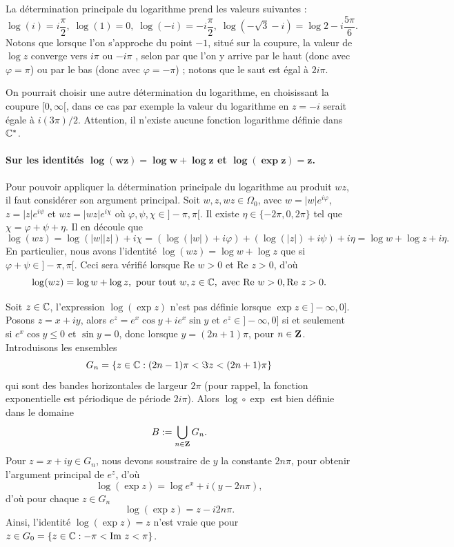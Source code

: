 La détermination principale du logarithme prend les valeurs suivantes :
\[\log (i)=i \frac{\pi}{2}, \; \log (1)=0,\; \log(-i)=-i \frac{\pi}{2},\; \log(-\sqrt{3} -i)=\log 2 -i\frac{5 \pi}{6}.\]
Notons que lorsque l'on s'approche du point $-1$, situé sur la coupure, la valeur de $\log z$ converge vers $i \pi$ ou $-i \pi$ , selon par que l'on y arrive par le \og haut \fg{} (donc avec $\varphi=\pi$) ou par le \og bas \fg{} (donc avec $\varphi=-\pi$) ; notons que le saut est égal à $2 i \pi$.

On pourrait choisir une autre détermination du logarithme, en choisissant la coupure $[0,\infty[$, dans ce cas par exemple la valeur du logarithme en $z=-i$ serait égale à $i (3 \pi)/2$. Attention, il n'existe aucune fonction logarithme définie dans $\mathbb{C}^\ast$. 


\paragraph{Sur les identités $\boldsymbol{\log(w z)=\log w + \log z}$ et $\boldsymbol{\log(\exp z)=z}$.} Pour pouvoir appliquer la détermination principale du logarithme au produit $w z$, il faut considérer son argument principal. Soit $w, z, w z \in \Omega_0$, avec $w=\lvert w \rvert e^{i \varphi}$, $z = \lvert z \rvert e^{i \psi}$ et $w z =\lvert w z \rvert e^{i \chi}$ où $\varphi, \psi, \chi \in ]-\pi, \pi[$. Il existe $\eta \in \{-2 \pi, 0, 2\pi \}$ tel que $\chi=\varphi + \psi + \eta$. Il en découle que
\[\log(w z) = \log (\lvert w \rvert\lvert z \rvert) + i \chi =  (\log (\lvert w \rvert) + i \varphi) + (\log (\lvert z \rvert) + i \psi) + i\eta = \log w + \log z + i\eta.\]
En particulier, nous avons l'identité $\log(w z)=\log w + \log z$ que si $\varphi + \psi \in ]-\pi, \pi[.$ Ceci sera vérifié lorsque $\text{Re } w>0$ et $\text{Re } z>0$, d'où
\[\log(w z)=\log w + \log z, \text{ pour tout } w, z \in \mathbb{C}, \text{ avec } \text{Re } w>0, \text{Re } z>0.\]

Soit $z \in \mathbb{C}$, l'expression $\log(\exp z)$ n'est pas définie lorsque $\exp z \in ]-\infty, 0]$. Posons $z=x + iy$, alors $e^z=e^x \cos y + i e^x \sin y$ et $e^z \in ]-\infty, 0]$ si et seulement si $e^x \cos y \leq  0$ et $\sin y=0$, donc lorsque $y=(2n+1)\pi$, pour $n \in {\mathbf Z}$. Introduisons les ensembles
\[G_n = \{z \in \mathbb{C} : (2n-1) \pi < \Im z < (2n +1) \pi \}\]
qui sont des bandes horizontales de largeur $2 \pi$ (pour rappel, la fonction exponentielle est périodique de période $2 i \pi$). Alors $\log \circ \exp$ est bien définie dans le domaine
\[B : = \bigcup_{n \in {\mathbf Z}} G_n.\]
Pour $z =x + iy \in G_n$, nous devons soustraire de $y$ la constante $2 n \pi$, pour obtenir l'argument principal de $e^z$, d'où
\[\log (\exp z)= \log e^x + i(y-2 n \pi),\]
d'où pour chaque $z \in G_n$
\[\log(\exp z) = z - i 2 n \pi.\]
Ainsi, l'identité $\log (\exp z)= z$ n'est vraie que pour $z \in G_0 = \{z \in \mathbb{C} : - \pi < \text{Im } z < \pi \}$.

